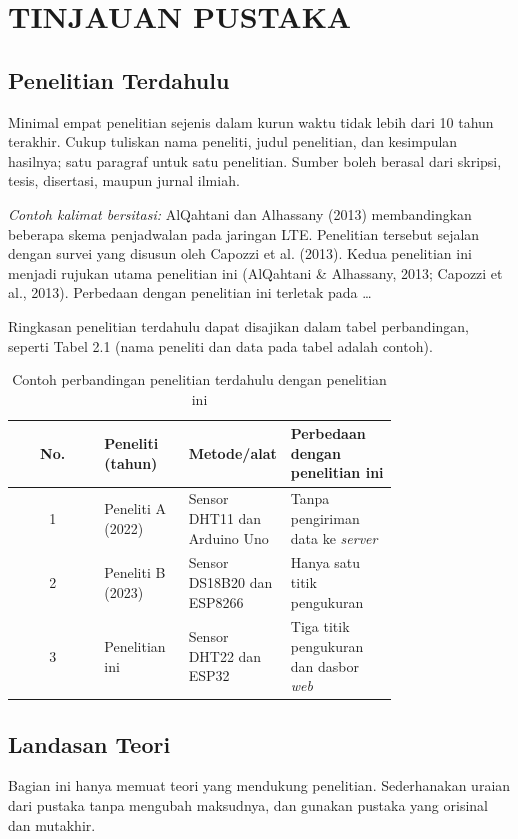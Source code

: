 \chapter{TINJAUAN PUSTAKA}

\section{Penelitian Terdahulu}
Minimal empat penelitian sejenis dalam kurun waktu tidak lebih dari 10 tahun terakhir. Cukup tuliskan nama peneliti, judul penelitian, dan kesimpulan hasilnya; satu paragraf untuk satu penelitian. Sumber boleh berasal dari skripsi, tesis, disertasi, maupun jurnal ilmiah.

\textit{Contoh kalimat bersitasi:} AlQahtani dan Alhassany (2013) membandingkan beberapa skema penjadwalan pada jaringan LTE. Penelitian tersebut sejalan dengan survei yang disusun oleh Capozzi et al. (2013). Kedua penelitian ini menjadi rujukan utama penelitian ini (AlQahtani \& Alhassany, 2013; Capozzi et al., 2013). Perbedaan dengan penelitian ini terletak pada …

Ringkasan penelitian terdahulu dapat disajikan dalam tabel perbandingan, seperti Tabel 2.1 (nama peneliti dan data pada tabel adalah contoh).

\begin{singlespace}
\begin{longtable}{|c|p{0.22\linewidth}|p{0.26\linewidth}|p{0.28\linewidth}|}
\caption{Contoh perbandingan penelitian terdahulu dengan penelitian ini}\\
\hline
\textbf{No.} & \textbf{Peneliti (tahun)} & \textbf{Metode/alat} & \textbf{Perbedaan dengan penelitian ini} \\
\hline
1 & Peneliti A (2022) & Sensor DHT11 dan Arduino Uno & Tanpa pengiriman data ke \textit{server} \\
\hline
2 & Peneliti B (2023) & Sensor DS18B20 dan ESP8266 & Hanya satu titik pengukuran \\
\hline
3 & Penelitian ini & Sensor DHT22 dan ESP32 & Tiga titik pengukuran dan dasbor \textit{web} \\
\hline
\end{longtable}
\end{singlespace}

\section{Landasan Teori}
Bagian ini hanya memuat teori yang mendukung penelitian. Sederhanakan uraian dari pustaka tanpa mengubah maksudnya, dan gunakan pustaka yang orisinal dan mutakhir.

